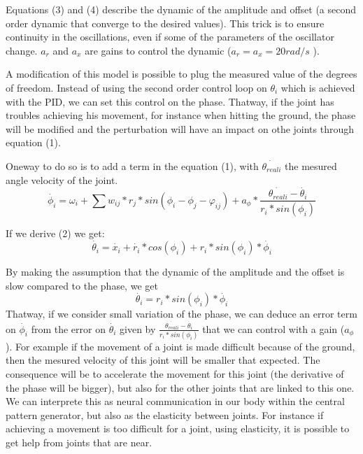 Equations (3) and (4) describe the dynamic of the amplitude and offset (a second order dynamic that converge to the desired values). This trick is to ensure continuity in the oscillations, even if some of the parameters of the oscillator change. $a_r$ and $a_x$ are gains to control the dynamic ($a_r = a_x = 20 rad/s$  \cite{sproewitz}). 


A modification of this model is possible to plug the measured value of the degrees of freedom. Instead of using the second order control loop on $\theta_i$ which is achieved with the PID, we can set this control on the phase. Thatway, if the joint has troubles achieving his movement, for instance when hitting the ground, the phase will be modified and the perturbation will have an impact on othe joints through equation (1).

Oneway to do so is to add a term in the equation (1), with $\dot{\theta_{reali}}$ the mesured angle velocity of the joint. 
\begin{equation*}
    \dot{\phi_i} = \omega_i + \sum{w_{ij} * r_j * sin(\phi_i - \phi_j - \varphi_{ij}) + a_{\phi} * \frac {\dot{\theta_{reali}} - \dot{\theta_i}} {r_i * sin (\phi_i)}} \tag{1}
\end{equation*}

If we derive (2) we get: 
\begin{equation*}
    \dot{\theta_i} = \dot{x_i} + \dot{r_i} * cos(\phi_i) + r_i * sin(\phi_i) * \dot{\phi_i} \tag{2'}
\end{equation*}

By making the assumption that the dynamic of the amplitude and the offset is slow compared to the phase, we get
\begin{equation*}
    \dot{\theta_i} = r_i * sin(\phi_i) * \dot{\phi_i} \tag{2''}
\end{equation*}
Thatway, if we consider small variation of the phase, we can deduce an error term on $\dot{\phi_i}$ from the error on $\dot{\theta_i}$ given by $\frac {\dot{\theta_{reali}} - \dot{\theta_i}} {r_i * sin (\phi_i)}$ that we can control with a gain ($a_{\phi}$).
For example if the movement of a joint is made difficult because of the ground, then the mesured velocity of this joint will be smaller that expected. The consequence will be to accelerate the movement for this joint (the derivative of the phase will be bigger), but also for the other joints that are linked to this one. We can interprete this as neural communication in our body within the central pattern generator, but also as the elasticity between joints. For instance if achieving a movement is too difficult for a joint, using elasticity, it is possible to get help from joints that are near. 


